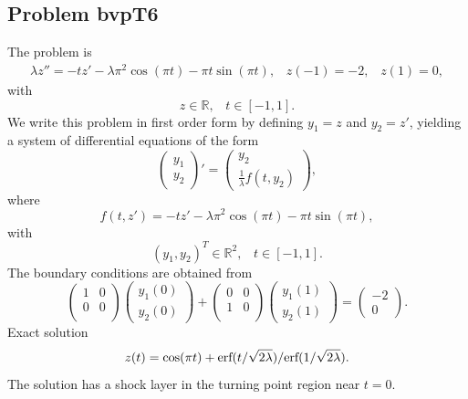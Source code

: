 \documentclass[<options>]{article}
\def \RR {{\mathbb{R}}}
\begin{document}
\subsection{Problem bvpT6}\label{test6}
The problem is 
\begin{eqnarray*}
\lambda z'' = - t z'  -\lambda \pi^{2} \cos(\pi t) - \pi t \sin(\pi t), \;\;\;z(-1) =   -2, \;\;\; z(1) = 0,
\end{eqnarray*}
with
\[
z \in \RR, \;\;\; t\in [-1,1].
\]
We write this problem in first order form by defining $y_1=z$ and $y_2=z'$, yielding a system of differential equations of the form
\begin{equation*}
\left(\begin{array}{c}
y_1\\
y_2
\end{array}\right)'=
\left(\begin{array}{c}
y_2\\
\frac{1}{\lambda}f(t,y_2)
\end{array}\right),
\end{equation*}
where
\begin{equation*}
f(t,z') = - t z'  -\lambda \pi^{2} \cos(\pi t) - \pi t \sin(\pi t),
\end{equation*}
with
\[
(y_1,y_2)^T \in \RR^{2}, \;\;\;  t \in [-1,1].
\]
The  boundary conditions are obtained from
\begin{equation*}
\left(
  \begin{array}{cc}
    1 & 0 \\
    0 & 0 \\
  \end{array}
\right)
\left(\begin{array}{c}
y_{1}(0)\\
y_{2}(0)
\end{array}\right)
+
\left(
  \begin{array}{cc}
    0 & 0 \\
    1 & 0 \\
  \end{array}
\right)
\left(\begin{array}{c}
y_{1}(1)\\
y_{2}(1)
\end{array}\right)=\left(\begin{array}{c}
-2 \\
0
\end{array}\right).
\end{equation*}
\textrm{Exact solution}
$$z(t) = \cos(\pi t) +  \textmd{erf}(t / \sqrt{ 2\lambda}) /  \textmd{erf}(1 / \sqrt{2\lambda}).$$
The solution has a shock layer in the turning point region near $t =0.$
\end{document}
